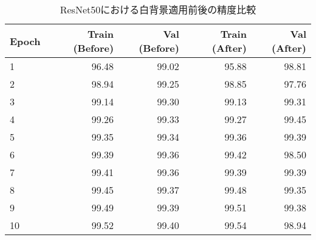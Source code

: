 \documentclass[a4paper,11pt,titlepage]{jsarticle}
\begin{document}
\begin{table}[H]
\centering
\caption{ResNet50における白背景適用前後の精度比較}
\label{tab:Resnet50_compare}
\begin{tabular}{l|rr|rr}
\hline
Epoch & Train (Before) & Val (Before) & Train (After) & Val (After) \\
\hline
1  & 96.48 & 99.02 & 95.88 & 98.81 \\
2  & 98.94 & 99.25 & 98.85 & 97.76 \\
3  & 99.14 & 99.30 & 99.13 & 99.31 \\
4  & 99.26 & 99.33 & 99.27 & 99.45 \\
5  & 99.35 & 99.34 & 99.36 & 99.39 \\
6  & 99.39 & 99.36 & 99.42 & 98.50 \\
7  & 99.41 & 99.36 & 99.39 & 99.39 \\
8  & 99.45 & 99.37 & 99.48 & 99.35 \\
9  & 99.49 & 99.39 & 99.51 & 99.38 \\
10 & 99.52 & 99.40 & 99.54 & 98.94 \\
\hline
\end{tabular}
\end{table}
\end{document}
